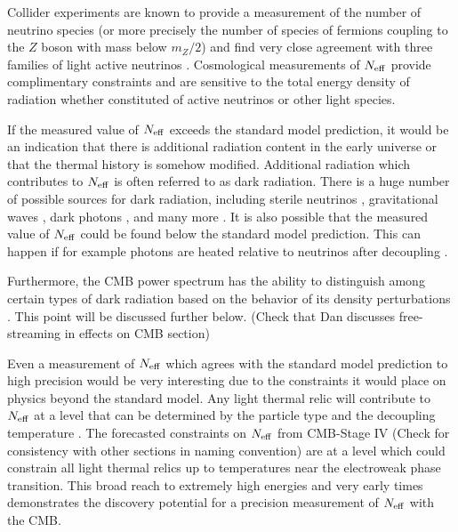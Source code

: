 Collider experiments are known to provide a measurement of the number of neutrino species (or more precisely the number of species of fermions coupling to the $Z$ boson with mass below $m_Z/2$) and find very close agreement with three families of light active neutrinos \cite{ALEPH:2005ab}.  Cosmological measurements of $N_{\rm eff}$ provide complimentary constraints and are sensitive to the total energy density of radiation whether constituted of active neutrinos or other light species.

If the measured value of $N_{\rm eff}$ exceeds the standard model prediction, it would be an indication that there is additional radiation content in the early universe or that the thermal history is somehow modified.  Additional radiation which contributes to $N_{\rm eff}$ is often referred to as dark radiation.  There is a huge number of possible sources for dark radiation, including sterile neutrinos \cite{Abazajian:2001nj,Strumia:2006db,Boyarsky:2009ix}, gravitational waves \cite{Boyle:2007zx,Stewart:2007fu,Meerburg:2015zua}, dark photons \cite{Ackerman:mha,Kaplan:2011yj,CyrRacine:2012fz}, and many more \cite{Cadamuro:2010cz,Weinberg:2013kea}.  It is also possible that the measured value of $N_{\rm eff}$ could be found below the standard model prediction.  This can happen if for example photons are heated relative to neutrinos after decoupling \cite{Steigman:2013yua,Boehm:2013jpa}.

Furthermore, the CMB power spectrum has the ability to distinguish among certain types of dark radiation based on the behavior of its density perturbations  \cite{Chacko:2015noa,Baumann:2015rya}.  This point will be discussed further below. {\color{blue} (Check that Dan discusses free-streaming in effects on CMB section)}

Even a measurement of $N_{\rm eff}$ which agrees with the standard model prediction to high precision would be very interesting due to the constraints it would place on physics beyond the standard model.  Any light thermal relic will contribute to $N_{\rm eff}$ at a level that can be determined by the particle type and the decoupling temperature \cite{Brust:2013ova,Chacko:2015noa}.  The forecasted constraints on $N_{\rm eff}$ from CMB-Stage IV {\color{blue} (Check for consistency with other sections in naming convention)} are at a level which could constrain all light thermal relics up to temperatures near the electroweak phase transition.  This broad reach to extremely high energies and very early times demonstrates the discovery potential for a precision measurement of $N_{\rm eff}$ with the CMB.

